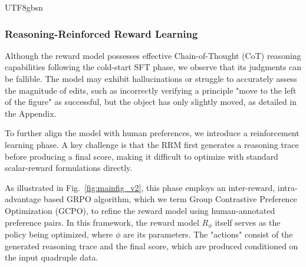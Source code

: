 \documentclass{llmxive}
\begin{document}
\begin{CJK*}{UTF8}{gbsn}
\subsubsection{Reasoning-Reinforced Reward Learning}
\label{sec:r3l}

Although the reward model possesses effective Chain-of-Thought (CoT) reasoning capabilities following the cold-start SFT phase, we observe that its judgments can be fallible. The model may exhibit hallucinations or struggle to accurately assess the magnitude of edits, such as incorrectly verifying a principle "move to the left of the figure" as successful, but the object has only slightly moved, as detailed in the Appendix. 

To further align the model with human preferences, we introduce a reinforcement learning phase.
A key challenge is that the RRM first generates a reasoning trace before producing a final score, making it difficult to optimize with standard scalar-reward formulations directly.




As illustrated in Fig.~\ref{fig:mainfig_v2}, this phase employs an inter-reward, intra-advantage based GRPO algorithm, which we term Group Contrastive Preference Optimization (GCPO), to refine the reward model using human-annotated preference pairs. In this framework, the reward model $R_\phi$ itself serves as the policy being optimized, where $\phi$ are its parameters. The "actions" consist of the generated reasoning trace and the final score, which are produced conditioned on the input quadruple data.


\end{CJK*}
\end{document}
